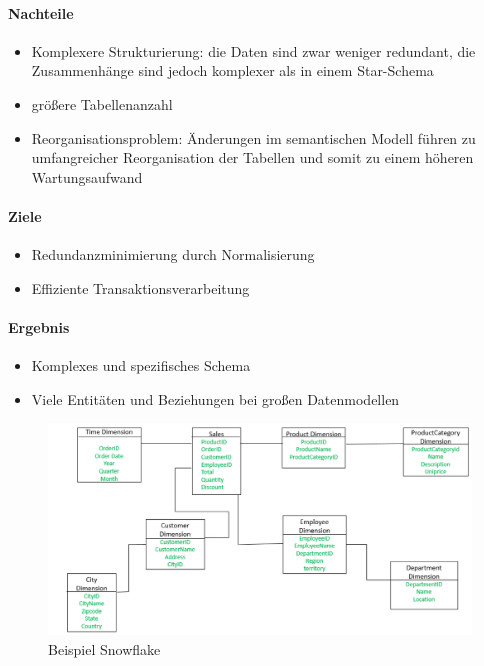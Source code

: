 \paragraph{Nachteile}
\begin{itemize}
    \item Komplexere Strukturierung: die Daten sind zwar weniger redundant, die Zusammenhänge sind jedoch komplexer als in einem Star-Schema
    \item größere Tabellenanzahl
    \item Reorganisationsproblem: Änderungen im semantischen Modell führen \newline zu umfangreicher Reorganisation der Tabellen und somit zu einem höheren Wartungsaufwand

\end{itemize}

\paragraph{Ziele}
\begin{itemize}
    \item Redundanzminimierung durch Normalisierung
    \item Effiziente Transaktionsverarbeitung

\end{itemize}

\paragraph{Ergebnis}
\begin{itemize}
    \item Komplexes und spezifisches Schema
    \item Viele Entitäten und Beziehungen bei großen Datenmodellen

\end{itemize}

\begin{figure}[H]
    \centering
    \includegraphics[width=.8\textwidth]{Content/images/modellierung/starb.png}
    \caption{Beispiel Snowflake}
    \label{fig:modellierung:starb}
\end{figure}

